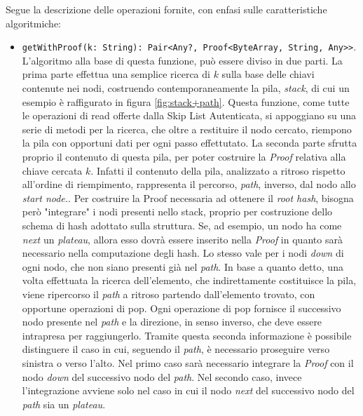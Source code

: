 	Segue la descrizione delle operazioni fornite, con enfasi sulle caratteristiche algoritmiche:
	
	\begin{itemize}
		\item \verb!getWithProof(k: String): Pair<Any?, Proof<ByteArray, String, Any>>!. L'algoritmo alla base di questa funzione, può essere diviso in due parti. La prima parte effettua una semplice ricerca di $ k $ sulla base delle chiavi contenute nei nodi, costruendo contemporaneamente la pila, \textit{stack}, di cui un esempio è raffigurato in figura \ref{fig:stack+path}. Questa funzione, come tutte le operazioni di read offerte dalla Skip List Autenticata, si appoggiano su una serie di metodi per la ricerca, che oltre a restituire il nodo cercato, riempono la pila con opportuni dati per ogni passo effettutato. La seconda parte sfrutta proprio il contenuto di questa pila, per poter costruire la \textit{Proof} relativa alla chiave cercata $ k $. Infatti il contenuto della pila, analizzato a ritroso rispetto all'ordine di riempimento, rappresenta il percorso, \textit{path}, inverso, dal nodo allo \textit{start node.}. Per costruire la Proof necessaria ad ottenere il \textit{root hash}, bisogna però "integrare" i nodi presenti nello stack, proprio per costruzione dello schema di hash adottato sulla struttura. Se, ad esempio, un nodo ha come \textit{next} un \textit{plateau}, allora esso dovrà essere inserito nella \textit{Proof} in quanto sarà necessario nella computazione degli hash. Lo stesso vale per i nodi \textit{down} di ogni nodo, che non siano presenti già nel \textit{path}.
		In base a quanto detto, una volta effettuata la ricerca dell'elemento, che indirettamente costituisce la pila, viene ripercorso il \textit{path} a ritroso partendo dall'elemento trovato, con opportune operazioni di pop. Ogni operazione di pop fornisce il successivo nodo presente nel \textit{path} e la direzione, in senso inverso, che deve essere intrapresa per raggiungerlo. Tramite questa seconda informazione è possibile distinguere il caso in cui, seguendo il \textit{path}, è necessario proseguire verso sinistra o verso l'alto. Nel primo caso sarà necessario integrare la \textit{Proof} con il nodo \textit{down} del successivo nodo del \textit{path}. Nel secondo caso, invece l'integrazione avviene solo nel caso in cui il nodo \textit{next} del successivo nodo del \textit{path} sia un \textit{plateau}.
		

\end{itemize}

